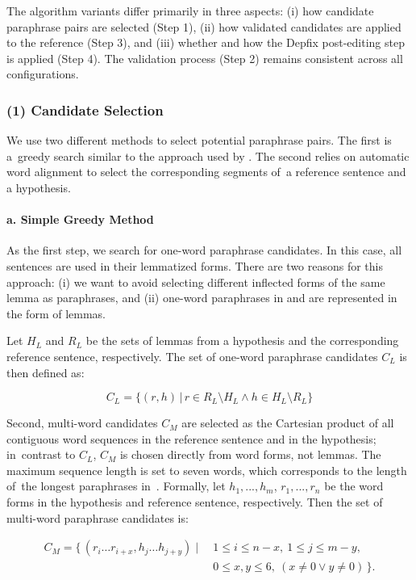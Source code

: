 The algorithm variants differ primarily in three aspects: 
(i) how candidate paraphrase pairs are selected (Step 1), 
(ii) how validated candidates are applied to the reference (Step 3), and 
(iii) whether and how the Depfix post-editing step is applied (Step 4). 
The validation process (Step 2) remains consistent across all configurations.

\subsubsection{(1) Candidate Selection}
\label{candidates}
We use two different methods to select potential paraphrase pairs. The first is a~greedy search similar to the approach used by \citet{kauchak}. The second relies on automatic word alignment to select the corresponding segments of~a reference sentence and a hypothesis.

\paragraph{a. Simple Greedy Method}
\hfill \break
As the first step, we search for one-word paraphrase candidates. In this case, all sentences are used in their lemmatized forms. There are two reasons for this approach: (i) we want to avoid selecting different inflected forms of the same lemma as paraphrases, and (ii) one-word paraphrases in \wordnet and \fm are represented in the form of lemmas.

Let $ H_{L} $ and $ R_{L} $ be the sets of lemmas from a hypothesis and the corresponding reference sentence, respectively. The set of one-word paraphrase candidates $C_{L} $ is then defined as:

\begin{equation*}
C_{L} = \{(r,h) \, | \, r \in R_{L} \setminus H_{L} \wedge h \in H_{L} \setminus R_{L} \} 
\end{equation*}

Second, multi-word candidates $ C_M $ are selected as the Cartesian product of all contiguous word sequences in the reference sentence and in the hypothesis; in~contrast to $C_{L}$, $C_M$ is chosen directly from word forms, not lemmas. The maximum sequence length is set to seven words, which corresponds to the length of~the longest paraphrases in~\cmpt. Formally, let $ h_1,...,h_m $, $ r_1,..., r_n $  be the word forms in the  hypothesis and reference sentence, respectively. Then the set of multi-word paraphrase candidates is:

\begin{align*}
C_{M} = \{\, ( r_i \ldots r_{i+x} ,  h_j\ldots h_{j+y}) \mid &\
1 \leq i \leq n-x,\ 
1 \leq j \leq m-y,\\
& \ 0 \leq x,y \leq 6,\ 
(x \neq 0 \lor y \neq 0) \,\}.
\end{align*} 
  
